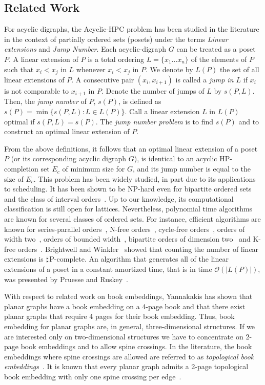 \documentclass{myllncs-mixalis}
\begin{document}
\subsection{Related Work}

For acyclic digraphs, the  Acyclic-HPC problem has been studied in
the literature in the context of partially ordered sets (posets)
under the terms  \emph{Linear extensions} and \emph{Jump Number}.
Each acyclic-digraph $G$ can be treated as a poset $P$. A linear
extension of $P$ is a total ordering $L =\{x_1 \ldots x_n\}$ of the
elements of $P$ such that $x_i < x_j$ in $L$ whenever $x_i < x_j$ in
$P$. We denote by $L(P)$ the set of all linear extensions of $P$. A
consecutive pair $(x_i, x_{i+1})$ is called a \emph{\emph{jump} in
$L$} if $x_i$ is not comparable to $x_{i+1}$ in $P$. Denote the
number of jumps of $L$  by $s(P, L)$. Then, the \emph{jump number}
of $P$, $s(P)$, is defined as $s(P) = \min \{s(P, L): L \in L(P)\}$.
Call  a linear extension $L$ in $L(P)$ optimal if $s(P, L) = s(P)$.
The \emph{jump number problem} is to find $s(P)$ and to construct an
optimal linear extension of $P$.

From the above definitions, it follows that an optimal linear
extension of a poset $P$ (or its corresponding  acyclic digraph
$G$), is identical to an acyclic HP-completion set $E_c$ of minimum
size for $G$, and its jump number is equal to the size of $E_c$.
This problem has been widely studied, in part due to its
applications to scheduling. It has been shown to be NP-hard even for
bipartite ordered sets~\cite{Pulleyblank81} and the class of
interval orders~\cite{Mitas91}. Up to our knowledge, its
computational classification is still open for lattices.
Nevertheless, polynomial time algorithms are known for several
classes of ordered sets. For instance, efficient algorithms are
known for series-parallel orders~\cite{CogisH79}, N-free
orders~\cite{Rival83}, cycle-free orders~\cite{DuffusRW82}, orders
of width two~\cite{CheinH84}, orders of bounded
width~\cite{ColbournP85}, bipartite orders of dimension
two~\cite{SteinerS87} and K-free orders~\cite{ShararyZ91}.
Brightwell and  Winkler~\cite{BrightwellW91} showed that counting
the number of linear extensions is $\boldmath{\sharp}$P-complete. An
algorithm that generates all of the linear extensions of a poset in
a constant amortized time, that is in time $\mathcal{O}(|L(P)|)$,
was presented by Pruesse and Ruskey~\cite{PruesseR94}.

With respect to related work on book embeddings,
Yannakakis\cite{Yannakakis89} has shown that planar graphs have a
book embedding on a 4-page book and that there exist planar graphs
that require 4 pages for their book embedding. Thus, book embedding
for planar graphs are, in general, three-dimensional structures. If
we are interested only on two-dimensional structures we have to
concentrate on  2-page book embeddings and to allow spine crossings.
In the literature, the book embeddings where spine crossings are
allowed are referred to as \emph{topological book
embeddings}~\cite{EnomotoMO99}. It is known that every planar graph
admits a 2-page topological book embedding with only one spine
crossing per edge~\cite{DiGiacomoDLW05}.
\end{document}
